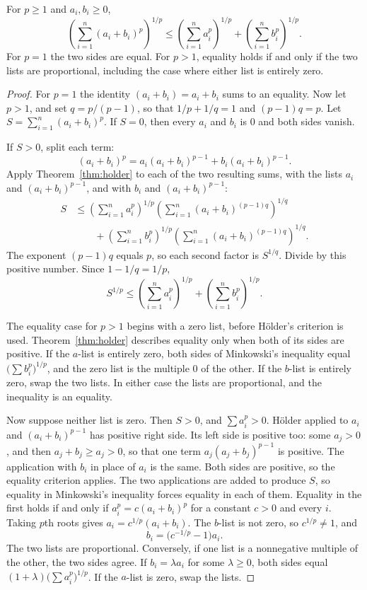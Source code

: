 \begin{theorem}[Minkowski]\label{thm:minkowski}
For $p\ge1$ and $a_i,b_i\ge0$,
\[
\left(\sum_{i=1}^n(a_i+b_i)^p\right)^{1/p}\le\left(\sum_{i=1}^na_i^p\right)^{1/p}+\left(\sum_{i=1}^nb_i^p\right)^{1/p}.
\]
For $p=1$ the two sides are equal. For $p>1$, equality holds if and only if the two lists are proportional, including the case where either list is entirely zero.
\end{theorem}
\begin{proof}
For $p=1$ the identity $(a_i+b_i)=a_i+b_i$ sums to an equality. Now let $p>1$, and set $q=p/(p-1)$, so that $1/p+1/q=1$ and $(p-1)q=p$. Let $S=\sum_{i=1}^n(a_i+b_i)^p$. If $S=0$, then every $a_i$ and $b_i$ is $0$ and both sides vanish.

If $S>0$, split each term:
\[
(a_i+b_i)^p=a_i(a_i+b_i)^{p-1}+b_i(a_i+b_i)^{p-1}.
\]
Apply Theorem~\ref{thm:holder} to each of the two resulting sums, with the lists $a_i$ and $(a_i+b_i)^{p-1}$, and with $b_i$ and $(a_i+b_i)^{p-1}$:
\begin{align*}
S&\le\left(\sum_{i=1}^na_i^p\right)^{1/p}\left(\sum_{i=1}^n(a_i+b_i)^{(p-1)q}\right)^{1/q}\\
&\qquad+\left(\sum_{i=1}^nb_i^p\right)^{1/p}\left(\sum_{i=1}^n(a_i+b_i)^{(p-1)q}\right)^{1/q}.
\end{align*}
The exponent $(p-1)q$ equals $p$, so each second factor is $S^{1/q}$. Divide by this positive number. Since $1-1/q=1/p$,
\[
S^{1/p}\le\left(\sum_{i=1}^na_i^p\right)^{1/p}+\left(\sum_{i=1}^nb_i^p\right)^{1/p}.
\]

The equality case for $p>1$ begins with a zero list, before Hölder's criterion is used. Theorem~\ref{thm:holder} describes equality only when both of its sides are positive. If the $a$-list is entirely zero, both sides of Minkowski's inequality equal $\bigl(\sum b_i^p\bigr)^{1/p}$, and the zero list is the multiple $0$ of the other. If the $b$-list is entirely zero, swap the two lists. In either case the lists are proportional, and the inequality is an equality.

Now suppose neither list is zero. Then $S>0$, and $\sum a_i^p>0$. Hölder applied to $a_i$ and $(a_i+b_i)^{p-1}$ has positive right side. Its left side is positive too: some $a_j>0$, and then $a_j+b_j\ge a_j>0$, so that one term $a_j(a_j+b_j)^{p-1}$ is positive. The application with $b_i$ in place of $a_i$ is the same. Both sides are positive, so the equality criterion applies. The two applications are added to produce $S$, so equality in Minkowski's inequality forces equality in each of them. Equality in the first holds if and only if $a_i^p=c(a_i+b_i)^p$ for a constant $c>0$ and every $i$. Taking $p$th roots gives $a_i=c^{1/p}(a_i+b_i)$. The $b$-list is not zero, so $c^{1/p}\ne1$, and
\[
b_i=\bigl(c^{-1/p}-1\bigr)a_i.
\]
The two lists are proportional. Conversely, if one list is a nonnegative multiple of the other, the two sides agree. If $b_i=\lambda a_i$ for some $\lambda\ge0$, both sides equal $(1+\lambda)\bigl(\sum a_i^p\bigr)^{1/p}$. If the $a$-list is zero, swap the lists.
\end{proof}

